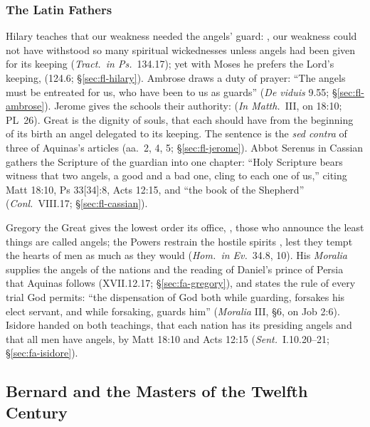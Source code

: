 \subsubsection{The Latin Fathers}

Hilary teaches that our weakness needed the angels' guard: , our weakness could not have withstood so
many spiritual wickednesses unless angels had been given for its keeping
(\emph{Tract.\ in Ps.}\ 134.17); yet with Moses he prefers the Lord's keeping,
 (124.6;
\S\ref{sec:fl-hilary}). Ambrose draws a duty of prayer: ``The angels must be
entreated for us, who have been to us as guards'' (\emph{De viduis} 9.55;
\S\ref{sec:fl-ambrose}). Jerome gives the schools their authority:
 (\emph{In Matth.}\ III, on 18:10; PL~26).
Great is the dignity of souls, that each should have from the beginning of
its birth an angel delegated to its keeping. The sentence is the \emph{sed
contra} of three of Aquinas's articles (aa.~2, 4, 5; \S\ref{sec:fl-jerome}).
Abbot Serenus in Cassian gathers the Scripture of the guardian into one
chapter: ``Holy Scripture bears witness that two angels, a good and a bad one,
cling to each one of us,'' citing Matt 18:10, Ps 33[34]:8, Acts 12:15, and
``the book of the Shepherd'' (\emph{Conl.}\ VIII.17; \S\ref{sec:fl-cassian}).

Gregory the Great gives the lowest order its office, , those who announce the least
things are called angels; the Powers restrain the hostile spirits , lest they tempt the
hearts of men as much as they would (\emph{Hom.\ in Ev.}\ 34.8, 10). His
\emph{Moralia} supplies the angels of the nations and the reading of
Daniel's prince of Persia that Aquinas follows (XVII.12.17;
\S\ref{sec:fa-gregory}), and states the rule of every trial God permits:
``the dispensation of God both while guarding, forsakes his elect servant,
and while forsaking, guards him'' (\emph{Moralia} III, \S6, on Job 2:6).
Isidore handed on both teachings, that each nation has its presiding angels
and that all men have angels, by Matt 18:10 and Acts 12:15 (\emph{Sent.}\
I.10.20--21; \S\ref{sec:fa-isidore}).

\sectionguard
\subsection{Bernard and the Masters of the Twelfth Century}\label{sec:gd-masters}

